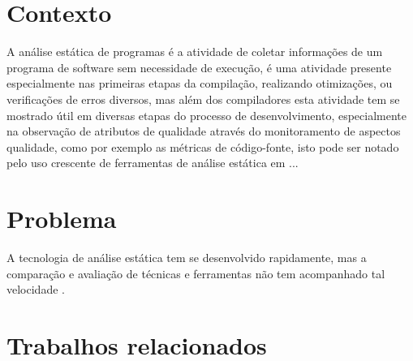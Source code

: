 \section{Contexto}
A análise estática de programas é a atividade de coletar informações de um
programa de software sem necessidade de execução, é uma atividade presente
especialmente nas primeiras etapas da compilação, realizando otimizações, ou
verificações de erros diversos, mas além dos compiladores esta atividade tem
se mostrado útil em diversas etapas do processo de desenvolvimento,
especialmente na observação de atributos de qualidade através do monitoramento
de aspectos qualidade, como por exemplo as métricas de código-fonte, isto pode
ser notado pelo uso crescente de ferramentas de análise estática em ...



\section{Problema}

A tecnologia de análise estática tem se desenvolvido rapidamente, mas a
comparação e avaliação de técnicas e ferramentas não tem acompanhado tal
velocidade \cite{Li2010}.

\section{Trabalhos relacionados}

